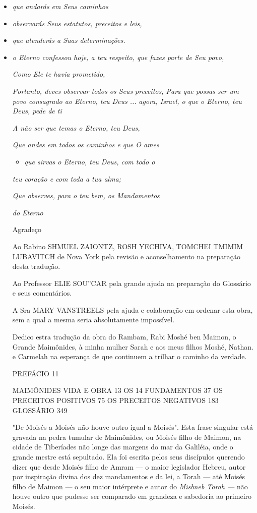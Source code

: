\begin{itemize}
\item
 \emph{que andarás em Seus caminhos}
\item
 \emph{observarás Seus estatutos, preceitos e leis,}
\item
 \emph{que atenderás a Suas determinações.}
\item
 
 \emph{o Eterno confessou hoje, a teu respeito, que fazes parte de Seu
 povo,}

\emph{Como Ele te havia prometido,}


\emph{Portanto, deves observar todos os Seus preceitos, Para que possas
ser um povo consagrado ao Eterno, teu Deus ...}
 \emph{agora, Israel, o que o Eterno, teu Deus, pede de ti}

\emph{A não ser que temas o Eterno, teu Deus,}

\emph{Que andes em todos os caminhos e que O ames}

\begin{itemize}
\item
 \emph{que sirvas o Eterno, teu Deus, com todo o}
\end{itemize}


\emph{teu coração e com toda a tua alma;}


\emph{Que observes, para o teu bem, os Mandamentos}


\emph{do Eterno}


Agradeço

Ao Rabino SHMUEL ZAIONTZ, ROSH YECHIVA, TOMCHEI TMIMIM LUBAVITCH de Nova
York pela revisão e aconselhamento na preparação desta tradução.

Ao Professor ELIE SOU''CAR pela grande ajuda na preparação do Glossário
e seus comentários.

A Sra MARY VANSTREELS pela ajuda e colabora­ção em ordenar esta obra,
sem a qual a mesma se­ria absolutamente impossível.

Dedico estra tradução da obra do Rambam, Rabi Moshé ben Maimon, o Grande
Maimônides, à minha mulher Sarah e aos meus filhos Moshé,
Nathan. e Carmelah na esperança de que continuem a
trilhar o caminho da verdade.


PREFÁCIO 11

MAIMÔNIDES VIDA E OBRA 13 OS 14 FUNDAMENTOS 37 OS PRECEITOS POSITIVOS 75
OS PRECEITOS NEGATIVOS 183 GLOSSÁRIO 349

"De Moisés a Moisés não houve outro igual a Moisés". Esta frase
singu­lar está gravada na pedra tumular de Maimônides, ou Moisés filho
de Maimon, na cidade de Tiberíades não longe das margens do mar da
Galiléia, onde o grande mestre está sepultado. Ela foi escrita pelos
seus discípulos querendo dizer que desde Moi­sés filho de Amram --- o
maior legislador Hebreu, autor por inspiração divina dos dez mandamentos
e da lei, a Torah --- até Moisés filho de Maimon --- o seu maior
intérprete e autor do \emph{Misbneb Torah ---} não houve outro que
pudesse ser compara­do em grandeza e sabedoria ao primeiro Moisés.


\end{itemize}
